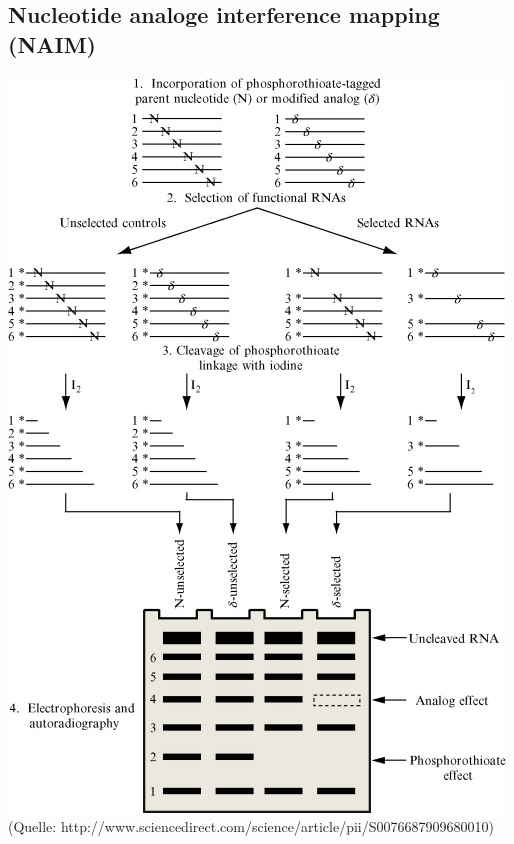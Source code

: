\subsection{Nucleotide analoge interference mapping (NAIM)}
\includegraphics[scale=0.7]{lectures/160527/pix/NAIM.jpg} \\
(Quelle: http://www.sciencedirect.com/science/article/pii/S0076687909680010) \\
 
